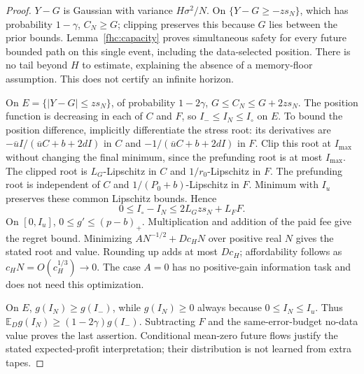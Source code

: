 \begin{proof}
$Y-G$ is Gaussian with variance $H\sigma^2/N$. On
$\{Y-G\ge-zs_N\}$, which has probability $1-\gamma$, $C_N\ge G$;
clipping preserves this because $G$ lies between the prior bounds.
Lemma~\ref{fhc:capacity} proves simultaneous safety for every future
bounded path on this single event, including the data-selected position.
There is no tail beyond $H$ to estimate, explaining the absence of a
memory-floor assumption. This does not certify an infinite horizon.

On $E=\{|Y-G|\le zs_N\}$, of probability $1-2\gamma$,
$G\le C_N\le G+2zs_N$. The position function is decreasing in each
of $C$ and $F$, so $I_-\le I_N\le I_\circ$ on $E$.
To bound the position difference, implicitly differentiate the stress root:
its derivatives are $-\overline u I/(\overline u C+b+2dI)$ in $C$
and $-1/(\overline u C+b+2dI)$ in $F$.
Clip this root at $I_{\max}$ without changing the final minimum, since
the prefunding root is at most $I_{\max}$. The clipped root is
$L_G$-Lipschitz in $C$ and $1/r_0$-Lipschitz in $F$.
The prefunding root is independent of $C$ and
$1/(P_0+b)$-Lipschitz in $F$. Minimum with $I_u$ preserves these
common Lipschitz bounds. Hence
\[
 0\le I_\circ-I_N\le 2L_Gzs_N+L_FF.
\]
On $[0,I_u]$, $0\le g'\le(p-b)_+$. Multiplication and addition of
the paid fee give the regret bound. Minimizing
$AN^{-1/2}+Dc_HN$ over positive real $N$ gives the stated root and
value. Rounding up adds at most $Dc_H$; affordability follows as
$c_HN=O(c_H^{1/3})\to0$. The case $A=0$ has no positive-gain
information task and does not need this optimization.

On $E$, $g(I_N)\ge g(I_-)$, while $g(I_N)\ge0$ always because
$0\le I_N\le I_u$. Thus
$\mathbb E_D g(I_N)\ge(1-2\gamma)g(I_-)$.
Subtracting $F$ and the same-error-budget no-data value proves the last assertion.
Conditional mean-zero future flows justify the stated expected-profit
interpretation; their distribution is not learned from extra tapes.
\end{proof}

